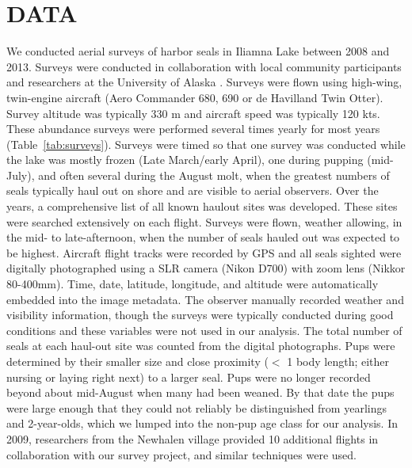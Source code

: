 \documentclass[12pt, titlepage]{article}\usepackage[]{graphicx}\usepackage[]{color}
\begin{document}
\section{DATA}

We conducted aerial surveys of harbor seals in Iliamna Lake between 2008 and 2013. Surveys were conducted in collaboration with local community participants and researchers at the University of Alaska \citep{Burn:Van:With:Hole:Asko:inte:2016}. Surveys were flown using high-wing, twin-engine aircraft (Aero Commander 680, 690 or de Havilland Twin Otter). Survey altitude was typically 330 m and aircraft speed was typically 120 kts. These abundance surveys were performed several times yearly for most years (Table~\ref{tab:surveys}). Surveys were timed so that one survey was conducted while the lake was mostly frozen (Late March/early April), one during pupping (mid-July), and often several during the August molt, when the greatest numbers of seals typically haul out on shore and are visible to aerial observers. Over the years, a comprehensive list of all known haulout sites was developed. These sites were searched extensively on each flight. Surveys were flown, weather allowing, in the mid- to late-afternoon, when the number of seals hauled out was expected to be highest. Aircraft flight tracks were recorded by GPS and all seals sighted were digitally photographed using a SLR camera (Nikon D700) with zoom lens (Nikkor 80-400mm). Time, date, latitude, longitude, and altitude were automatically embedded into the image metadata. The observer manually recorded weather and visibility information, though the surveys were typically conducted during good conditions and these variables were not used in our analysis. The total number of seals at each haul-out site was counted from the digital photographs. Pups were determined by their smaller size and close proximity ($<$ 1 body length; either nursing or laying right next) to a larger seal. Pups were no longer recorded beyond about mid-August when many had been weaned. By that date the pups were large enough that they could not reliably be distinguished from yearlings and 2-year-olds, which we lumped into the non-pup age class for our analysis. In 2009, researchers from the Newhalen village provided 10 additional flights in collaboration with our survey project, and similar techniques were used. 
\end{document}
